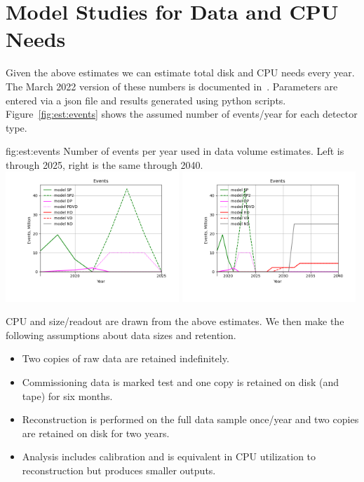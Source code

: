 \documentclass[../main-v1.tex]{subfiles}
\begin{document}
\section{Model Studies for Data and CPU Needs }
\label{sec:est:volumes}

Given the above estimates we can  estimate total disk and CPU needs every year.  The March 2022 version of these numbers is documented in~\cite{bib:docdb24732}.  Parameters are entered via a json file and results generated using python scripts. Figure~\ref{fig:est:events} shows the assumed number of events/year for each detector type.  

\begin{dunefigure}
{fig:est:events}
{Number of events per year used in data volume estimates. Left is through 2025, right is the same through 2040.  }
\includegraphics[width=0.49\textwidth]{graphics/IntroFigures/2025/Parameters_2022-03-04-2025-Events.png}
\includegraphics[width=0.49\textwidth]{graphics/IntroFigures/2040/Parameters_2022-03-04-2040-Events.png}
\end{dunefigure}

CPU and size/readout are drawn from the above estimates. We then make the following assumptions about data sizes and retention.  

\begin{itemize}
\item Two copies of raw data are retained indefinitely.
\item Commissioning data is marked test and one copy is retained on disk (and tape) for six months. 
\item Reconstruction is performed on the full data sample once/year and two copies are retained on disk for two years.  
\item Analysis includes calibration and is  equivalent in CPU utilization to reconstruction but produces smaller outputs. 
\end{itemize}
\end{document}

